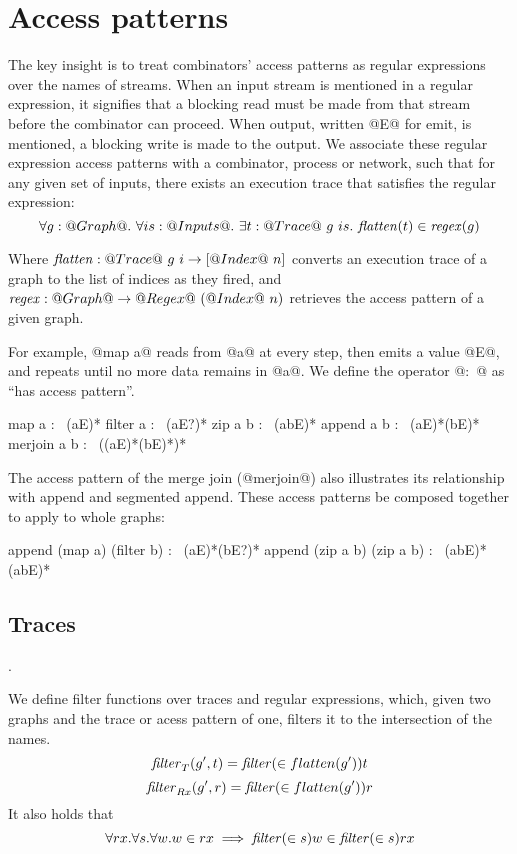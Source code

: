 \section{Access patterns}
\label{s:Access}

The key insight is to treat combinators' access patterns as regular expressions over the names of streams.
When an input stream is mentioned in a regular expression, it signifies that a blocking read must be made from that stream before the combinator can proceed.
When output, written @E@ for emit, is mentioned, a blocking write is made to the output.
We associate these regular expression access patterns with a combinator, process or network, such that for any given set of inputs, there exists an execution trace that satisfies the regular expression:
\[ \forall g : @Graph@.~ \forall is : @Inputs@.~ \exists t : @Trace@~g~is.~
    \mathit{flatten}(t) \in \mathit{regex}(g) \]

Where $\mathit{flatten} : @Trace@~g~i \to [@Index@~n]$ converts an execution trace of a graph to the list of indices as they fired, and $\mathit{regex} : @Graph@ \to @Regex@~(@Index@~n)$ retrieves the access pattern of a given graph.

For example, @map a@ reads from @a@ at every step, then emits a value @E@, and repeats until no more data remains in @a@.
We define the operator @:~@ as ``has access pattern''.
\begin{code}
map     a   :~ (aE)*
filter  a   :~ (aE?)*
zip     a b :~ (abE)*
append  a b :~ (aE)*(bE)*
merjoin a b :~ ((aE)*(bE)*)*
\end{code}
The access pattern of the merge join (@merjoin@) also illustrates its relationship with append and segmented append.
These access patterns be composed together to apply to whole graphs:

\begin{code}
append (map a)  (filter b) :~ (aE)*(bE?)*
append (zip a b) (zip a b) :~ (abE)*(abE)*
\end{code}

\subsection{Traces}
.

We define filter functions over traces and regular expressions, which, given two graphs and the trace or acess pattern of one, filters it to the intersection of the names.
\[ \mathit{filter}_{T}(g', t) = \mathit{filter} (\in flatten(g')) t \]
\[ \mathit{filter}_{Rx}(g', r) = \mathit{filter} (\in flatten(g')) r \]
It also holds that
\[ \forall rx. \forall s. \forall w. w \in rx \implies \mathit{filter}(\in s) w \in \mathit{filter}(\in s) rx\]

